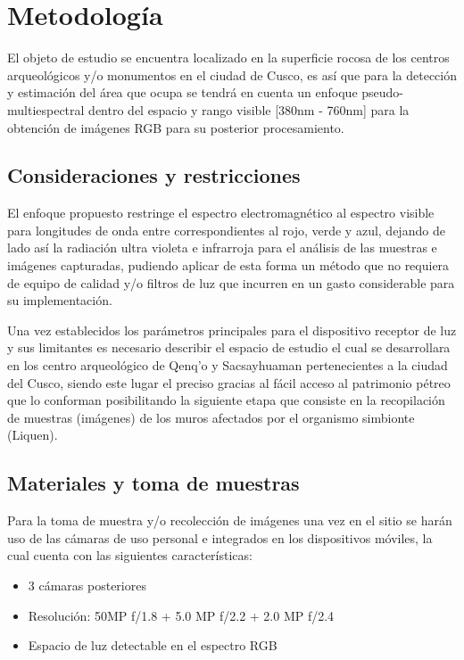 \chapter{Metodología}

El objeto de estudio se encuentra localizado en la superficie rocosa de los centros arqueológicos y/o monumentos en el ciudad de Cusco, es así que para la detección y estimación del área que ocupa se tendrá en cuenta un enfoque pseudo-multiespectral dentro del espacio y rango visible [380nm - 760nm] para la obtención de imágenes RGB para su posterior procesamiento.

\section{Consideraciones y restricciones}
El enfoque propuesto restringe el espectro electromagnético al espectro visible para longitudes de onda entre correspondientes al rojo, verde y azul, dejando de lado así la radiación ultra violeta e infrarroja para el análisis de las muestras e imágenes capturadas, pudiendo aplicar de esta forma un método que no requiera de equipo de calidad y/o filtros de luz que incurren en un gasto considerable para su implementación.

Una vez establecidos los parámetros principales para el dispositivo receptor de luz y sus limitantes es necesario describir el espacio de estudio el cual se desarrollara en los centro arqueológico de Qenq'o y Sacsayhuaman pertenecientes a la ciudad del Cusco, siendo este lugar el preciso gracias al fácil acceso al patrimonio pétreo que lo conforman posibilitando la siguiente etapa que consiste en la recopilación de muestras (imágenes) de los muros afectados por el organismo simbionte (Liquen).

\section{Materiales y toma de muestras}
Para la toma de muestra y/o recolección de imágenes una vez en el sitio se harán uso de las cámaras de uso personal e integrados en los dispositivos móviles, la cual cuenta con las siguientes características:

\begin{itemize}
	\item 3 cámaras posteriores
	\item Resolución: 50MP f/1.8 + 5.0 MP f/2.2 + 2.0 MP f/2.4
	\item Espacio de luz detectable en el espectro RGB
\end{itemize} 

